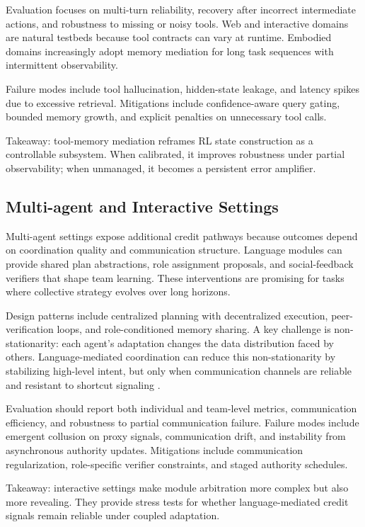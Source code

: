 \documentclass[pdflatex,sn-mathphys-num]{sn-jnl}
\begin{document}
Evaluation focuses on multi-turn reliability, recovery after incorrect intermediate actions, and robustness to missing or noisy tools. Web and interactive domains are natural testbeds because tool contracts can vary at runtime. Embodied domains increasingly adopt memory mediation for long task sequences with intermittent observability.

Failure modes include tool hallucination, hidden-state leakage, and latency spikes due to excessive retrieval. Mitigations include confidence-aware query gating, bounded memory growth, and explicit penalties on unnecessary tool calls.

Takeaway: tool-memory mediation reframes RL state construction as a controllable subsystem. When calibrated, it improves robustness under partial observability; when unmanaged, it becomes a persistent error amplifier.

\subsection{Multi-agent and Interactive Settings}
Multi-agent settings expose additional credit pathways because outcomes depend on coordination quality and communication structure. Language modules can provide shared plan abstractions, role assignment proposals, and social-feedback verifiers that shape team learning. These interventions are promising for tasks where collective strategy evolves over long horizons.

Design patterns include centralized planning with decentralized execution, peer-verification loops, and role-conditioned memory sharing. A key challenge is non-stationarity: each agent's adaptation changes the data distribution faced by others. Language-mediated coordination can reduce this non-stationarity by stabilizing high-level intent, but only when communication channels are reliable and resistant to shortcut signaling \cite{arxiv_p_2304_07297,arxiv_p_2310_03903,arxiv_p_2602_08335,arxiv_p_2602_11583}.

Evaluation should report both individual and team-level metrics, communication efficiency, and robustness to partial communication failure. Failure modes include emergent collusion on proxy signals, communication drift, and instability from asynchronous authority updates. Mitigations include communication regularization, role-specific verifier constraints, and staged authority schedules.

Takeaway: interactive settings make module arbitration more complex but also more revealing. They provide stress tests for whether language-mediated credit signals remain reliable under coupled adaptation.
\end{document}
